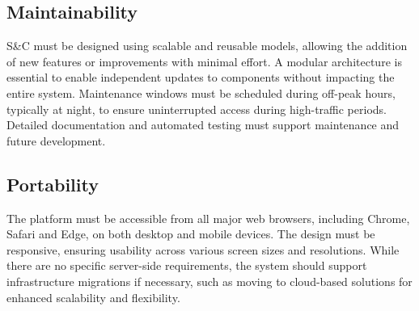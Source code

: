 \subsection{Maintainability}
S\&C must be designed using scalable and reusable models, allowing the addition of new features or improvements with minimal effort.
A modular architecture is essential to enable independent updates to components without impacting the entire system.
Maintenance windows must be scheduled during off-peak hours, typically at night, to ensure uninterrupted access during high-traffic periods.
Detailed documentation and automated testing must support maintenance and future development.

\subsection{Portability}
The platform must be accessible from all major web browsers, including Chrome, Safari and Edge, on both desktop and mobile devices.
The design must be responsive, ensuring usability across various screen sizes and resolutions.
While there are no specific server-side requirements, the system should support infrastructure migrations if necessary, such as moving to cloud-based solutions for enhanced scalability and flexibility.

